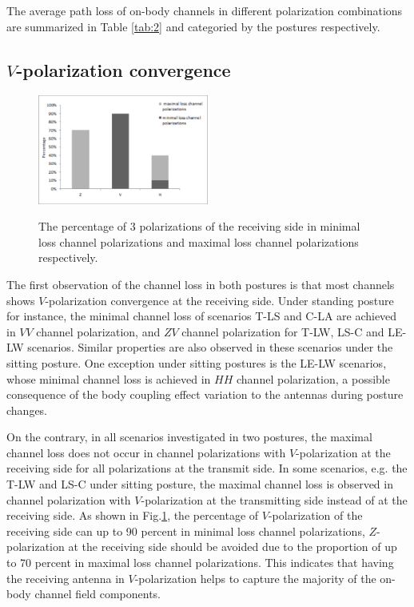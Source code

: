 \documentclass[conference]{IEEEtran}
\begin{document}
The average path loss of on-body channels in different polarization combinations are summarized in Table \ref{tab:2} and categoried by the postures respectively.

\subsection{$V$-polarization convergence}
\begin{figure}[!t]
  \centering
  \includegraphics[width=0.5\textwidth]{figs/6.eps}\\
  \caption{The percentage of 3 polarizations of the receiving side in minimal loss channel polarizations and maximal loss channel polarizations respectively.}
  \label{fig:polarization percentage}
\end{figure}

The first observation of the channel loss in both postures is that most channels shows $V$-polarization convergence at the receiving side. Under standing posture for instance,  the minimal channel loss of scenarios T-LS and C-LA are achieved in $VV$ channel polarization, and $ZV$ channel polarization for T-LW, LS-C and LE-LW scenarios. Similar properties are also observed in these scenarios under the sitting posture. One exception under sitting postures is the LE-LW scenarios, whose minimal channel loss is achieved in $HH$ channel polarization, a possible consequence of the body coupling effect variation to the antennas during posture changes.

On the contrary, in all scenarios investigated in two postures, the maximal channel loss does not occur in channel polarizations with $V$-polarization at the receiving side for all polarizations at the transmit side.  In some scenarios, e.g. the T-LW and LS-C under sitting posture, the maximal channel loss is observed in channel polarization with $V$-polarization at the transmitting side instead of at the receiving side. As shown in Fig.\ref{fig:polarization percentage}, the percentage of $V$-polarization of the receiving side can up to 90 percent in minimal loss channel polarizations, $Z$-polarization at the receiving side should be avoided due to the proportion of up to 70 percent in maximal loss channel polarizations. This indicates that having the receiving antenna in $V$-polarization helps to capture the majority of the on-body channel field components.
\end{document}
